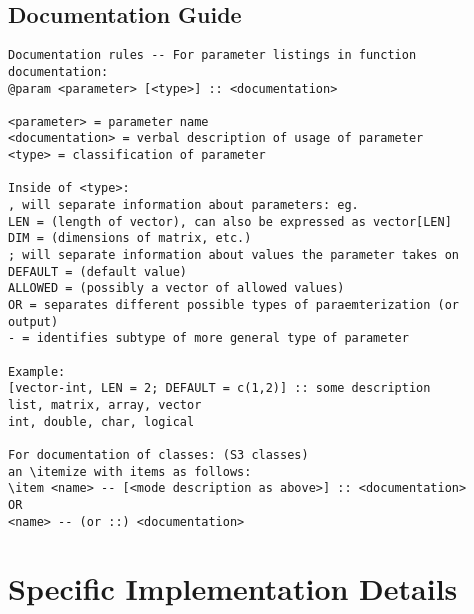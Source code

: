 \documentclass[11pt]{article}
\begin{document}
\pagebreak

\subsection{Documentation Guide}
\begin{verbatim}
Documentation rules -- For parameter listings in function documentation: 
@param <parameter> [<type>] :: <documentation>

<parameter> = parameter name
<documentation> = verbal description of usage of parameter
<type> = classification of parameter

Inside of <type>: 
, will separate information about parameters: eg. 
LEN = (length of vector), can also be expressed as vector[LEN]
DIM = (dimensions of matrix, etc.)
; will separate information about values the parameter takes on
DEFAULT = (default value)
ALLOWED = (possibly a vector of allowed values)
OR = separates different possible types of paraemterization (or output)
- = identifies subtype of more general type of parameter

Example: 
[vector-int, LEN = 2; DEFAULT = c(1,2)] :: some description
list, matrix, array, vector
int, double, char, logical

For documentation of classes: (S3 classes)
an \itemize with items as follows: 
\item <name> -- [<mode description as above>] :: <documentation>
OR 
<name> -- (or ::) <documentation>
\end{verbatim}


\section{Specific Implementation Details}
\end{document}
